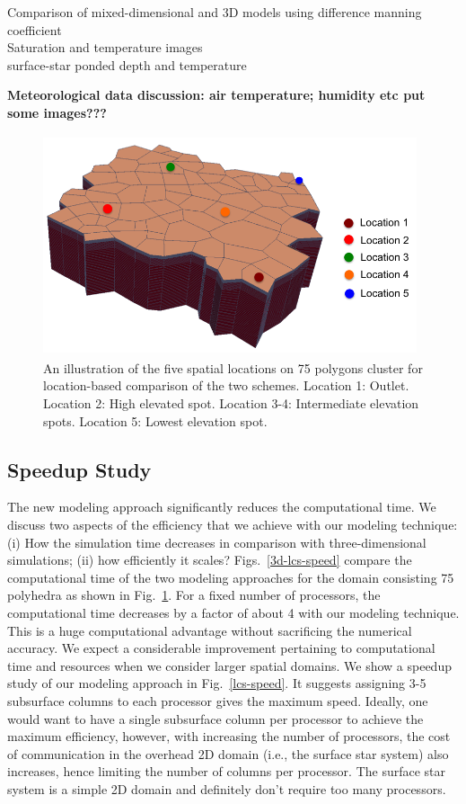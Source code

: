 \documentclass[review]{elsarticle}
\begin{document}
Comparison of mixed-dimensional and 3D models using difference manning coefficient \\
Saturation and temperature images\\
surface-star ponded depth and temperature

\textbf{Meteorological data discussion: air temperature; humidity etc put some images???}

 \begin{figure}[!htpb]
\centering
\includegraphics[height = 6.5cm, width=11cm]{figures/lobster75-3d.png}
\caption{An illustration of the five spatial locations on 75 polygons cluster for location-based comparison of the two schemes. Location 1: Outlet. Location 2: High elevated spot. Location 3-4: Intermediate elevation spots. Location 5: Lowest elevation spot.}
\label{surf-location}
\end{figure}

\subsection{Speedup Study}  
The new modeling approach significantly reduces the computational time. We discuss two aspects of the efficiency that we achieve with our modeling technique: (i) How the simulation time decreases in comparison with three-dimensional simulations; (ii) how efficiently it scales? Figs.~\ref{3d-lcs-speed} compare the computational time of the two modeling approaches for the domain consisting 75 polyhedra as shown in Fig.~\ref{surf-location}.
For a fixed number of processors, the computational time decreases by a factor of about 4 with our modeling technique. This is a huge computational advantage without sacrificing the numerical accuracy. We expect a considerable improvement pertaining to computational time and resources when we consider larger spatial domains. We show a speedup study of our modeling approach in Fig.~\ref{lcs-speed}. It suggests assigning 3-5 subsurface columns to each processor gives the maximum speed. Ideally, one would want to have a single subsurface column per processor to achieve the maximum efficiency, however, with increasing the number of processors, the cost of communication in the overhead 2D domain (i.e., the surface star system) also increases, hence limiting the number of columns per processor. The surface star system is a simple 2D domain and definitely don't require too many processors. 
 
\end{document}
